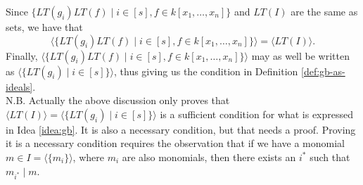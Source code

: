 \documentclass[10pt]{article}
\newcommand*{\ideal}[1]{\langle#1\rangle}
\begin{document}
Since $\{LT(g_i)LT(f) \mid i \in [s], f \in k[x_1, \ldots, x_n]\}$ and $LT(I)$ are the same as sets, we have that
\[\ideal{\{LT(g_i)LT(f) \mid i \in [s], f \in k[x_1, \ldots, x_n]\}} = \ideal{LT(I)}.\] Finally, $\ideal{\{LT(g_i)LT(f) \mid i \in [s], f \in k[x_1, \ldots, x_n]\}}$ may as well be written as $\ideal{\{LT(g_i) \mid i \in [s]\}}$, thus giving us the condition in Definition \ref{def:gb-as-ideals}. \\

N.B. Actually the above discussion only proves that $\ideal{LT(I)} = \ideal{\{LT(g_i) \mid i \in [s]\}}$ is a sufficient condition for what is expressed in Idea \ref{idea:gb}. It is also a necessary condition, but that needs a proof. Proving it is a necessary condition requires the observation that if we have a monomial $m \in I = \ideal{\{m_i\}}$, where $m_i$ are also monomials, then there exists an $i^*$ such that $m_{i^*} \mid m$.
%
% 
\end{document}
